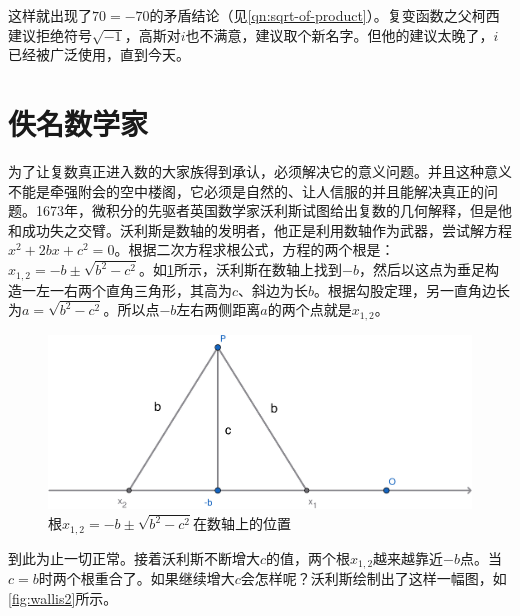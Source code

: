 \documentclass[b5paper]{ctexart}
\begin{document}
这样就出现了$70 = -70$的矛盾结论（见\cref{qn:sqrt-of-product}）。复变函数之父柯西建议拒绝符号$\sqrt{-1}$，高斯对$i$也不满意，建议取个新名字。但他的建议太晚了，$i$已经被广泛使用，直到今天。

\section{佚名数学家}

为了让复数真正进入数的大家族得到承认，必须解决它的意义问题。并且这种意义不能是牵强附会的空中楼阁，它必须是自然的、让人信服的并且能解决真正的问题。1673年，微积分的先驱者英国数学家沃利斯试图给出复数的几何解释，但是他和成功失之交臂。沃利斯是数轴的发明者，他正是利用数轴作为武器，尝试解方程$x^2 + 2bx + c^2 = 0$。根据二次方程求根公式，方程的两个根是：$x_{1,2} = -b \pm \sqrt{b^2 - c^2}$。如\cref{fig:wallis1}所示，沃利斯在数轴上找到$-b$，然后以这点为垂足构造一左一右两个直角三角形，其高为$c$、斜边为长$b$。根据勾股定理，另一直角边长为$a = \sqrt{b^2 - c^2}$。所以点$-b$左右两侧距离$a$的两个点就是$x_{1,2}$。

\begin{figure}[htbp]
  \centering
  \includegraphics[scale=0.33]{img/wallis1}
  \caption{根$x_{1,2} = -b \pm \sqrt{b^2 - c^2}$在数轴上的位置}
 \label{fig:wallis1}
\end{figure}

到此为止一切正常。接着沃利斯不断增大$c$的值，两个根$x_{1,2}$越来越靠近$-b$点。当$c = b$时两个根重合了。如果继续增大$c$会怎样呢？沃利斯绘制出了这样一幅图，如\cref{fig:wallis2}所示。
\end{document}
